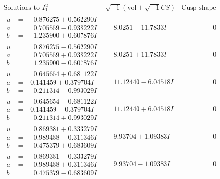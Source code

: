 \documentclass[1p]{elsarticle_modified}
\theoremstyle{definition}
\newcommand{\I}{\sqrt{-1}}
\begin{document}
$$\begin{array}{c|c|c}  
\text{Solutions to }I^u_{1}& \I (\text{vol} + \sqrt{-1}CS) & \text{Cusp shape}\\
 \hline 
\begin{aligned}
u &= \phantom{-}0.876275 + 0.562290 I \\
a &= \phantom{-}0.705559 - 0.938222 I \\
b &= \phantom{-}1.235900 + 0.607876 I\end{aligned}
 & \phantom{-}8.0251 - 11.7833 I & \phantom{-0.000000 } 0 \\ \hline\begin{aligned}
u &= \phantom{-}0.876275 - 0.562290 I \\
a &= \phantom{-}0.705559 + 0.938222 I \\
b &= \phantom{-}1.235900 - 0.607876 I\end{aligned}
 & \phantom{-}8.0251 + 11.7833 I & \phantom{-0.000000 } 0 \\ \hline\begin{aligned}
u &= \phantom{-}0.645654 + 0.681122 I \\
a &= -0.141459 + 0.379704 I \\
b &= \phantom{-}0.211314 - 0.993029 I\end{aligned}
 & \phantom{-}11.12440 - 6.04518 I & \phantom{-0.000000 } 0 \\ \hline\begin{aligned}
u &= \phantom{-}0.645654 - 0.681122 I \\
a &= -0.141459 - 0.379704 I \\
b &= \phantom{-}0.211314 + 0.993029 I\end{aligned}
 & \phantom{-}11.12440 + 6.04518 I & \phantom{-0.000000 } 0 \\ \hline\begin{aligned}
u &= \phantom{-}0.869381 + 0.333279 I \\
a &= \phantom{-}0.989488 - 0.311346 I \\
b &= \phantom{-}0.475379 + 0.683609 I\end{aligned}
 & \phantom{-}9.93704 + 1.09383 I & \phantom{-0.000000 } 0 \\ \hline\begin{aligned}
u &= \phantom{-}0.869381 - 0.333279 I \\
a &= \phantom{-}0.989488 + 0.311346 I \\
b &= \phantom{-}0.475379 - 0.683609 I\end{aligned}
 & \phantom{-}9.93704 - 1.09383 I & \phantom{-0.000000 } 0 \\ \hline\begin{aligned}

\end{aligned}
\end{array}$$
\end{document}
